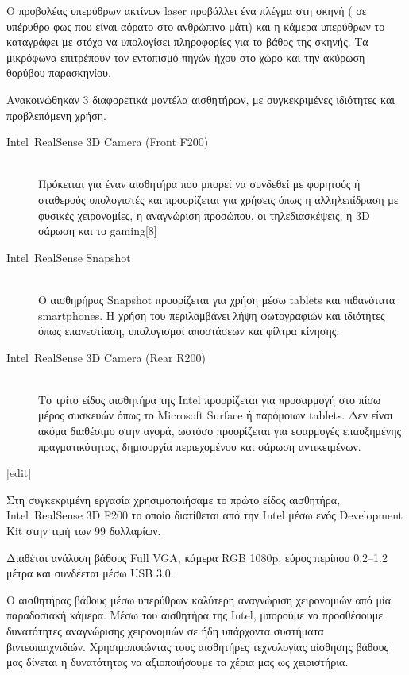 Ο προβολέας υπερύθρων ακτίνων laser προβάλλει ένα πλέγμα στη σκηνή ( σε υπέρυθρο φως που είναι αόρατο στο ανθρώπινο μάτι) και η κάμερα υπερύθρων το καταγράφει με στόχο να υπολογίσει πληροφορίες για το βάθος της σκηνής.
Τα μικρόφωνα επιτρέπουν τον εντοπισμό πηγών ήχου στο χώρο και την ακύρωση θορύβου παρασκηνίου.


Ανακοινώθηκαν 3 διαφορετικά μοντέλα αισθητήρων, με συγκεκριμένες ιδιότητες και προβλεπόμενη χρήση. 

\begin{description}
  \item[Intel\textregistered\ RealSense\texttrademark{} 3D Camera (Front F200)] \hfill \\
  Πρόκειται για έναν αισθητήρα που μπορεί να συνδεθεί με φορητούς ή σταθερούς υπολογιστές και προορίζεται για χρήσεις όπως η αλληλεπίδραση με φυσικές χειρονομίες, η αναγνώριση προσώπου, οι τηλεδιασκέψεις, η 3D σάρωση και το gaming[8]
  
  \item[Intel\textregistered\ RealSense\texttrademark{} Snapshot] \hfill \\
 Ο αισθηρήρας Snapshot προορίζεται για χρήση μέσω tablets και πιθανότατα smartphones. Η χρήση του περιλαμβάνει λήψη φωτογραφιών και ιδιότητες όπως επανεστίαση, υπολογισμοί αποστάσεων και φίλτρα κίνησης. 


  \item[Intel\textregistered\ RealSense\texttrademark{} 3D Camera (Rear R200)] \hfill \\
  Το τρίτο είδος αισθητήρα της Intel προορίζεται για προσαρμογή στο πίσω μέρος συσκευών όπως το Microsoft Surface ή παρόμοιων tablets. Δεν είναι ακόμα διαθέσιμο στην αγορά, ωστόσο προορίζεται για εφαρμογές επαυξημένης πραγματικότητας, δημιουργία περιεχομένου και σάρωση αντικειμένων.
\end{description}
[edit]



Στη συγκεκριμένη εργασία χρησιμοποιήσαμε το πρώτο είδος αισθητήρα, Intel\textregistered\ RealSense\texttrademark{} 3D F200 το οποίο διατίθεται από την Intel μέσω ενός Development Kit στην τιμή των 99 δολλαρίων.


Διαθέται ανάλυση βάθους Full VGA, κάμερα RGB 1080p, εύρος περίπου 0.2–1.2 μέτρα και συνδέεται μέσω USB 3.0.


Ο αισθητήρας βάθους μέσω υπερύθρων καλύτερη αναγνώριση χειρονομιών από μία παραδοσιακή κάμερα.
Μέσω του αισθητήρα της Intel, μπορούμε να προσθέσουμε δυνατότητες αναγνώρισης χειρονομιών σε ήδη υπάρχοντα συστήματα βιντεοπαιχνιδιών.
Χρησιμοποιώντας τους αισθητήρες τεχνολογίας αίσθησης βάθους μας δίνεται η δυνατότητας να αξιοποιήσουμε τα χέρια μας ως χειριστήρια.

